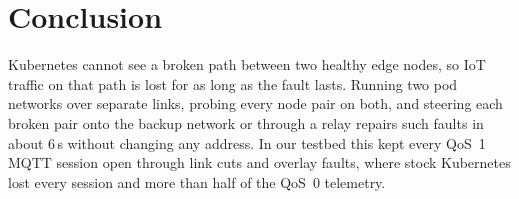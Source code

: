 \documentclass[conference,compsoc]{IEEEtran}
\begin{document}
\section{Conclusion}
\label{sec:conclusion}
Kubernetes cannot see a broken path between two healthy edge nodes, so IoT traffic
on that path is lost for as long as the fault lasts. Running two pod networks over
separate links, probing every node pair on both, and steering each broken pair onto
the backup network or through a relay repairs such faults in about 6\,s without
changing any address. In our testbed this kept every QoS~1 MQTT session open through
link cuts and overlay faults, where stock Kubernetes lost every session and more than
half of the QoS~0 telemetry.



\end{document}
